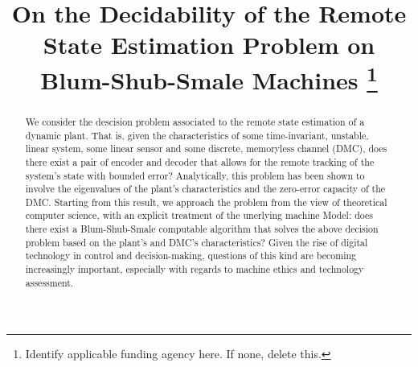 \documentclass[conference]{IEEEtran}
\begin{document}
%
	\title{On the Decidability of the Remote State Estimation Problem on Blum-Shub-Smale Machines
	\thanks{{\color{red} Identify applicable funding agency here. If none, delete this.}}
	}

	\author{
	\and
	\and
	}

\maketitle

\begin{abstract}
	We consider the descision problem associated to the remote state estimation of a dynamic plant. 
	That is, given the characteristics of some time-invariant, unstable, linear system, some linear sensor and some discrete, 
	memoryless channel (DMC), does there exist a pair of encoder and decoder that allows for the remote tracking of the system's 
	state with bounded error? Analytically, this problem has been shown to involve the eigenvalues of the plant's characteristics 
	and the zero-error capacity of the DMC. Starting from this result, we approach the problem from the view of theoretical computer science, 
	with an explicit treatment of the unerlying machine Model: does there exist a Blum-Shub-Smale computable algorithm that solves the above 
	decision problem based on the plant's and DMC's characteristics? Given the rise of digital technology in control and decision-making, 
	questions of this kind are becoming increasingly important, especially with regards to machine ethics and technology assessment. 
\end{abstract}
\end{document}
